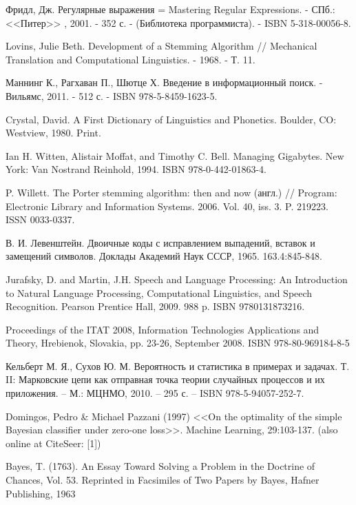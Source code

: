\documentclass[a4paper,12pt,preview]{report} %
\begin{document}
	
	\begin{thebibliography}{3}
		Фридл, Дж. Регулярные выражения = Mastering Regular Expressions. - СПб.: <<Питер>> , 2001. - 352 с. - (Библиотека программиста). - ISBN 5-318-00056-8.
		
		Lovins, Julie Beth. Development of a Stemming Algorithm // Mechanical Translation and Computational Linguistics. - 1968. - Т. 11.
		
		Маннинг К., Рагхаван П., Шютце Х. Введение в информационный поиск. - Вильямс, 2011. - 512 с. - ISBN 978-5-8459-1623-5.
		
		Crystal, David. A First Dictionary of Linguistics and Phonetics. Boulder, CO: Westview, 1980. Print.
		
		Ian H. Witten, Alistair Moffat, and Timothy C. Bell. Managing Gigabytes. New York: Van Nostrand Reinhold, 1994. ISBN 978-0-442-01863-4.
		
		P. Willett. The Porter stemming algorithm: then and now (англ.) // Program: Electronic Library and Information Systems. 2006. Vol. 40, iss. 3. P. 219223.  ISSN 0033-0337.
		
		В. И. Левенштейн. Двоичные коды с исправлением выпадений, вставок и замещений символов. Доклады Академий Наук СССР, 1965. 163.4:845-848.
		
		Jurafsky, D. and Martin, J.H. Speech and Language Processing: An Introduction to Natural Language Processing, Computational Linguistics, and Speech Recognition. Pearson Prentice Hall, 2009. 988 p. ISBN 9780131873216.
		
		Proceedings of the ITAT 2008, Information Technologies Applications and Theory, Hrebienok, Slovakia, pp. 23-26, September 2008. ISBN 978-80-969184-8-5
		
		Кельберт М. Я., Сухов Ю. М. Вероятность и статистика в примерах и задачах. Т. II: Марковские цепи как отправная точка теории случайных процессов и их приложения. -- М.: МЦНМО, 2010. -- 295 с. -- ISBN 978-5-94057-252-7.
		
		Domingos, Pedro \& Michael Pazzani (1997) <<On the optimality of the simple Bayesian classifier under zero-one loss>>. Machine Learning, 29:103-137. (also online at CiteSeer: [1])
		
		Bayes, T. (1763). An Essay Toward
		Solving a Problem in the Doctrine
		of Chances, Vol. 53. Reprinted in
		Facsimiles of Two Papers by Bayes,
		Hafner Publishing, 1963
		

\end{thebibliography}
\end{document}

